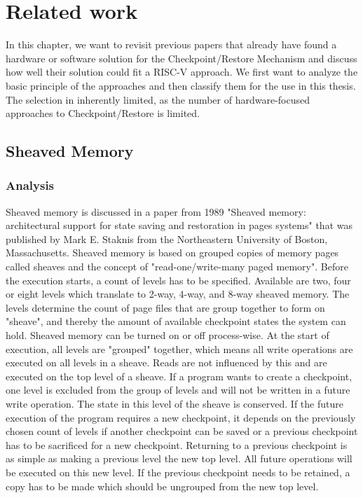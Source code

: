 
\chapter{Related work}\label{chap:related_work}
In this chapter, we want to revisit previous papers that
already have found a hardware or software solution
for the Checkpoint/Restore Mechanism
and discuss how well their solution could fit a RISC-V
approach. We first want to analyze the basic principle of
the approaches and then classify them for the use in this thesis.
The selection in inherently limited, as the number of
hardware-focused approaches to Checkpoint/Restore is
limited.

\section{Sheaved Memory}
\subsection{Analysis}
Sheaved memory is discussed in a paper from 1989 
"Sheaved memory: architectural support for state saving and 
restoration in pages systems" \cite{Staknis:1989:SMA:68182.68191}
that was published by Mark E. Staknis from the Northeastern 
University of Boston, Massachusetts.
Sheaved memory is based on grouped copies of memory pages called sheaves
and the concept of "read-one/write-many paged memory".
Before the execution starts, a count of
levels has to be specified. Available are two, four or eight levels
which translate to 2-way, 4-way, and 8-way sheaved memory.
The levels determine the count of page files that are group
together to form on "sheave", and thereby the amount of available checkpoint
states the system can hold. Sheaved memory can be turned on or off
process-wise. At the start of execution, all levels are "grouped"
together, which means all write operations are executed on all
levels in a sheave. Reads are not influenced by this and are executed
on the top level of a sheave. If a program wants to create a checkpoint, one
level is excluded from the group of levels and will not be
written in a future write operation. The state in this level of the sheave
is conserved. If the future execution of the program requires a new checkpoint,
it depends on the previously chosen count of levels if another
checkpoint can be saved or a previous checkpoint has to be sacrificed
for a new checkpoint. Returning to a previous checkpoint is as simple as
making a previous level the new top level. All future operations
will be executed on this new level. If the previous checkpoint needs
to be retained, a copy has to be made which should be ungrouped from
the new top level.

